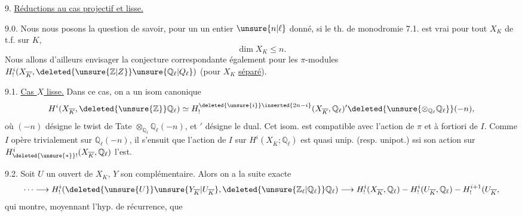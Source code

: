 9. \uline{Réductions au cas projectif et lisse.}

9.0. Nous nous posons la question de savoir, pour un  un entier $\unsure{n|\ell}$ donné, si le th. de monodromie 7.1. est vrai pour tout $X_K$ de t.f. sur $K$,  
\[
\dim X_K\leq n.
\]
Nous allons d'ailleurs envisager la conjecture correspondante également pour les $\pi$-modules $H^i_!(X_{\overline K},\deleted{\unsure{\mathbb Z|Z}}\unsure{\mathbb Q_\ell|Q_\ell})$ (pour $X_K$ \uline{séparé}).

9.1. \uline{Cas $X$ lisse.}  Dans ce cas,   on a un isom canonique
\[
H^i(X_{\overline K},\deleted{\unsure{\mathbb Z}}\mathbb Q_\ell)\simeq H^{\deleted{\unsure{i}}\inserted{2n-i}}_!(X_{\overline K},\mathbb Q_\ell)'\deleted{\unsure{\otimes_{\mathbb Q_\ell}\mathbb Q_\ell}}(-n),
\]
où \deleted{$\unsure{\otimes}$} $(-n)$ désigne le twist de Tate $\otimes_{\mathbb Q_\ell}\mathbb Q_\ell(-n)$,  et $'$ désigne le dual. Cet isom. est compatible avec l'action de $\pi$ et à fortiori de $I$. Comme $I$ opère trivialement sur $\mathbb Q_\ell(-n)$, il s'ensuit que l'action de $I$ sur $H^i(X_{\overline K};\mathbb Q_\ell)$ est quasi unip. (resp. unipot.) ssi son action sur $H^i_{\deleted{\unsure{*}}!}(X_{\overline K},\mathbb Q_\ell)$ l'est.

9.2.    Soit $U$ un ouvert   de $X_K$, $Y$ son complémentaire. Alors on a la suite exacte
\[
\cdots\longrightarrow H^i_!(\deleted{\unsure{U}}\unsure{Y_{\overline K}|U_{\overline K}},\deleted{\unsure{\mathbb Z_\ell|\mathbb Q_\ell}}\mathbb Q_\ell)\longrightarrow H^i_!(X_{\overline K},\mathbb Q_\ell)-H^i_!(U_{\overline K},\mathbb Q_\ell)-H^{i+1}_!(U_{\overline K},
\]
qui montre, moyennant l'hyp. de récurrence, que
